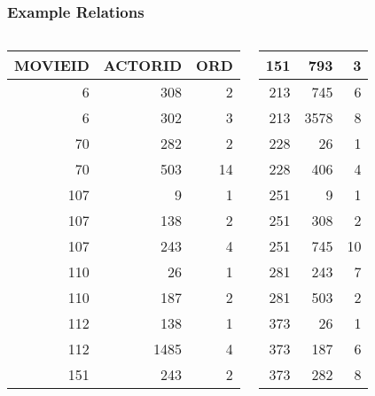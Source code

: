 \documentclass[dvipsnames]{beamer}
\theoremstyle{plain}
\begin{document}
\begin{frame}
  \frametitle{Example Relations}

  \begin{example}
    \begin{columns}[b]
      \begin{tiny}
      \begin{table}
        \begin{tabular}{|r|r|r|}\hline
MOVIEID & ACTORID & ORD\\\hline\hline
      6 &     308 &   2\\\hline
      6 &     302 &   3\\\hline
     70 &     282 &   2\\\hline
     70 &     503 &  14\\\hline
    107 &       9 &   1\\\hline
    107 &     138 &   2\\\hline
    107 &     243 &   4\\\hline
    110 &      26 &   1\\\hline
    110 &     187 &   2\\\hline
    112 &     138 &   1\\\hline
    112 &    1485 &   4\\\hline
    151 &     243 &   2\\\hline
        \end{tabular}
      \end{table}
      \end{tiny}

      \begin{tiny}
      \begin{table}
        \begin{tabular}{|r|r|r|}\hline
    151 &     793 &   3\\\hline
    213 &     745 &   6\\\hline
    213 &    3578 &   8\\\hline
    228 &      26 &   1\\\hline
    228 &     406 &   4\\\hline
    251 &       9 &   1\\\hline
    251 &     308 &   2\\\hline
    251 &     745 &  10\\\hline
    281 &     243 &   7\\\hline
    281 &     503 &   2\\\hline
    373 &      26 &   1\\\hline
    373 &     187 &   6\\\hline
    373 &     282 &   8\\\hline
        \end{tabular}
      \end{table}
      \end{tiny}


\end{columns}
\end{example}
\end{frame}
\end{document}
